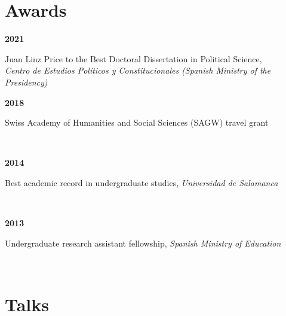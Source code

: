 \documentclass[a4paper, 12pt]{article}
\begin{document}
\section*{Awards}


\begin{minipage}[t]{0.1\textwidth}
\textbf{2021}
\end{minipage}\hfill\begin{minipage}[t]{0.9\textwidth}
Juan Linz Price to the Best Doctoral Dissertation in Political Science,\\\textit{Centro de Estudios Políticos y Constitucionales (Spanish Ministry of the Presidency)}\\\vspace{-8pt}
\end{minipage}
\begin{minipage}[t]{0.1\textwidth}
\textbf{2018}
\end{minipage}\hfill\begin{minipage}[t]{0.9\textwidth}
Swiss Academy of Humanities and Social Sciences (SAGW) travel grant
\end{minipage}\\
\begin{minipage}[t]{0.1\textwidth}
\textbf{2014}
\end{minipage}\hfill\begin{minipage}[t]{0.9\textwidth}
Best academic record in undergraduate studies, {\it Universidad de Salamanca}
\end{minipage}\\
\begin{minipage}[t]{0.1\textwidth}
\textbf{2013}
\end{minipage}\hfill\begin{minipage}[t]{0.9\textwidth}
Undergraduate research assistant fellowship, {\it Spanish Ministry of Education}
\end{minipage}\\

\section*{Talks}
\end{document}
